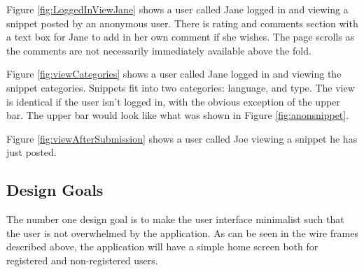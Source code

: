 \documentclass{sig-alt-release2}
\begin{document}
Figure \ref{fig:LoggedInViewJane} shows a user called Jane logged in and viewing
a snippet posted by an anonymous user. There is rating and comments section
with a text box for Jane to add in her own comment if she wishes. The page
scrolls as the comments are not necessarily immediately available above the
fold.

Figure \ref{fig:viewCategories} shows a user called Jane logged in and viewing
the snippet categories. Snippets fit into two categories: language, and type.
The view is identical if the user isn't logged in, with the obvious exception
of the upper bar. The upper bar would look like what was shown in Figure
\ref{fig:anonsnippet}.

Figure \ref{fig:viewAfterSubmission} shows a user called Joe viewing a snippet
he has just posted.

%
%
%
%
%

\subsection{Design Goals}

The number one design goal is to make the user interface minimalist
such that the user is not overwhelmed by the application. As can be
seen in the wire frames described above, the application will have a simple
home screen both for registered and non-registered users.
\end{document}
